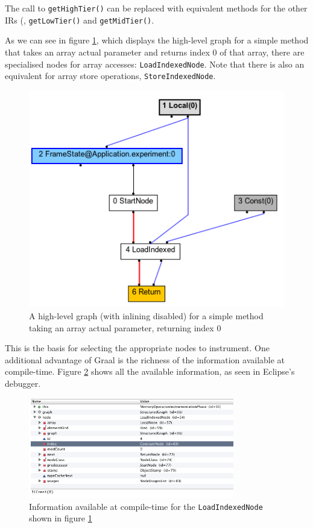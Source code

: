 	The call to \texttt{getHighTier()} can be replaced with equivalent methods for the other IRs (\ie, \texttt{getLowTier()} and \texttt{getMidTier()}.
	
	As we can see in figure \ref{fig:access-index}, which displays the high-level graph for a simple method that takes an array actual parameter and returns index $0$ of that array, there are specialised nodes for array accesses: \texttt{LoadIndexedNode}. Note that there is also an equivalent for array store operations, \texttt{StoreIndexedNode}.
	
	\begin{figure}[h]
		\centering
		\includegraphics[width=.7\textwidth]{graphics/access-index.png}
		\caption{A high-level graph (with inlining disabled) for a simple method taking an array actual parameter, returning index 0}
		\label{fig:access-index}
	\end{figure}
	
	This is the basis for selecting the appropriate nodes to instrument. One additional advantage of Graal is the richness of the information available at compile-time. Figure \ref{fig:graal-meta} shows all the available information, as seen in Eclipse's debugger.
	
	\begin{figure}[h]
		\centering
		\includegraphics[width=0.8\textwidth]{graphics/graal-metadata.png}
		\caption{Information available at compile-time for the \texttt{LoadIndexedNode} shown in figure \ref{fig:access-index}}
		\label{fig:graal-meta}
	\end{figure}
	
